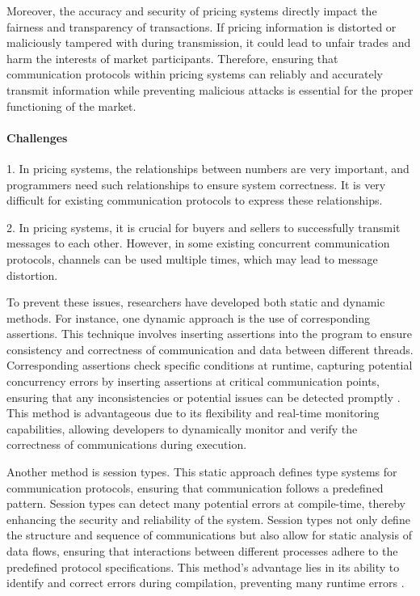 \documentclass[master,english]{kuisthesis}
\begin{document}
Moreover, the accuracy and security of pricing systems directly impact the fairness and transparency of transactions. If pricing information is distorted or maliciously tampered with during transmission, it could lead to unfair trades and harm the interests of market participants. Therefore, ensuring that communication protocols within pricing systems can reliably and accurately transmit information while preventing malicious attacks is essential for the proper functioning of the market.



\paragraph{Challenges}

1. In pricing systems, the relationships between numbers are very important, and programmers need such relationships to ensure system correctness. It is very difficult for existing communication protocols to express these relationships.

2. In pricing systems, it is crucial for buyers and sellers to successfully transmit messages to each other. However, in some existing concurrent communication protocols, channels can be used multiple times, which may lead to message distortion.



To prevent these issues, researchers have developed both static and dynamic methods. For instance, one dynamic approach is the use of corresponding assertions. This technique involves inserting assertions into the program to ensure consistency and correctness of communication and data between different threads. Corresponding assertions check specific conditions at runtime, capturing potential concurrency errors by inserting assertions at critical communication points, ensuring that any inconsistencies or potential issues can be detected promptly \cite{?}. This method is advantageous due to its flexibility and real-time monitoring capabilities, allowing developers to dynamically monitor and verify the correctness of communications during execution.

Another method is session types. This static approach defines type systems for communication protocols, ensuring that communication follows a predefined pattern. Session types can detect many potential errors at compile-time, thereby enhancing the security and reliability of the system. Session types not only define the structure and sequence of communications but also allow for static analysis of data flows, ensuring that interactions between different processes adhere to the predefined protocol specifications. This method's advantage lies in its ability to identify and correct errors during compilation, preventing many runtime errors \cite{?}.
\end{document}
